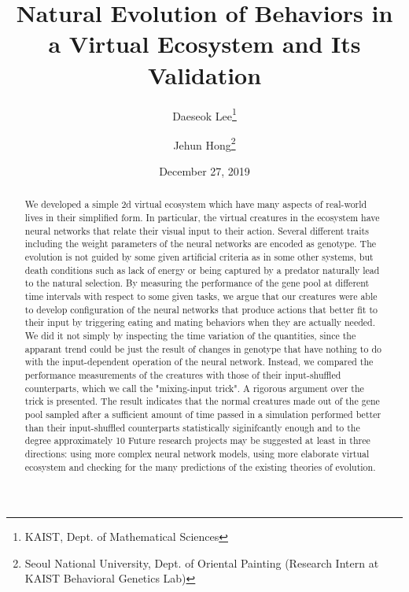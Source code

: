 \documentclass{article}
\numberwithin{equation}{section}
\begin{document}
\title{Natural Evolution of Behaviors in a Virtual Ecosystem and Its Validation}
\date{December 27, 2019}
\author{Daeseok Lee\thanks{KAIST, Dept. of Mathematical Sciences} \and Jehun Hong\thanks{Seoul National University, Dept. of Oriental Painting (Research Intern at KAIST Behavioral Genetics Lab)}}
\maketitle
\begin{abstract}
	We developed a simple 2d virtual ecosystem which have many aspects of real-world lives in their simplified form. In particular, the virtual creatures in the ecosystem have neural networks that relate their visual input to their action. Several different traits including the weight parameters of the neural networks are encoded as genotype. The evolution is not guided by some given  artificial criteria as in some other systems, but death conditions such as lack of energy or being captured by a predator naturally lead to the natural selection.   
	By measuring the performance of the gene pool at different time intervals with respect to some given tasks, we argue that our creatures were able to develop configuration of the neural networks that produce actions that better fit to their input by triggering eating and mating behaviors when they are actually needed. 
	We did it not simply by inspecting the time variation of the quantities, since the apparant trend could be just the result of changes in genotype that have nothing to do with the input-dependent operation of the neural network.
	Instead, we compared the performance measurements of the creatures with those of their input-shuffled counterparts, which we call the "mixing-input trick". A rigorous argument over the trick is presented.
   The result indicates that the normal creatures made out of the gene pool sampled after a sufficient amount of time passed in a simulation performed better than their input-shuffled counterparts statistically siginifcantly enough and to the degree approximately 10%
   Future research projects may be suggested at least in three directions: using more complex neural network models, using more elaborate virtual ecosystem and checking for the many predictions of the existing theories of evolution. 

   
	
\end{abstract}

\end{document}

